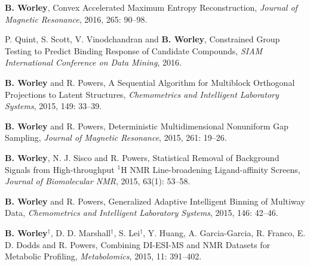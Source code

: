 \documentclass[letterpaper]{article}
\renewenvironment{itemize}{
  \begin{list}{}{
    \setlength{\leftmargin}{1.5em}
  }
}{
  \end{list}
}
\begin{document}
\begin{itemize}
\item \textbf{B. Worley},
 Convex Accelerated Maximum Entropy Reconstruction,
 {\it Journal of Magnetic Resonance}, 2016, 265: 90--98.
\end{itemize}

\begin{itemize}
\item P. Quint, S. Scott, V. Vinodchandran and \textbf{B. Worley},
 Constrained Group Testing to Predict Binding
 Response of Candidate Compounds,
 {\it SIAM International Conference on Data Mining}, 2016.
\end{itemize}

\begin{itemize}
\item \textbf{B. Worley} and R. Powers,
 A Sequential Algorithm for Multiblock Orthogonal
 Projections to Latent Structures,
 {\it Chemometrics and Intelligent Laboratory Systems},
 2015, 149: 33--39.
\end{itemize}

\begin{itemize}
\item \textbf{B. Worley} and R. Powers,
 Deterministic Multidimensional Nonuniform Gap Sampling,
 {\it Journal of Magnetic Resonance},
 2015, 261: 19--26.
\end{itemize}

\begin{itemize}
\item \textbf{B. Worley}, N. J. Sisco and R. Powers,
 Statistical Removal of Background Signals from High-throughput $^1$H NMR
 Line-broadening Ligand-affinity Screens,
 {\it Journal of Biomolecular NMR},
 2015, 63(1): 53--58.
\end{itemize}

\begin{itemize}
\item \textbf{B. Worley} and R. Powers,
 Generalized Adaptive Intelligent Binning of Multiway Data,
 {\it Chemometrics and Intelligent Laboratory Systems},
 2015, 146: 42--46.
\end{itemize}

\begin{itemize}
\item \textbf{B. Worley}$^\dagger$, D. D. Marshall$^\dagger$,
 S. Lei$^\dagger$, Y. Huang, A. Garcia-Garcia, R. Franco,
 E. D. Dodds and R. Powers, Combining DI-ESI-MS and NMR Datasets for
 Metabolic Profiling,
 {\it Metabolomics},
 2015, 11: 391--402.
\end{itemize}
\end{document}
